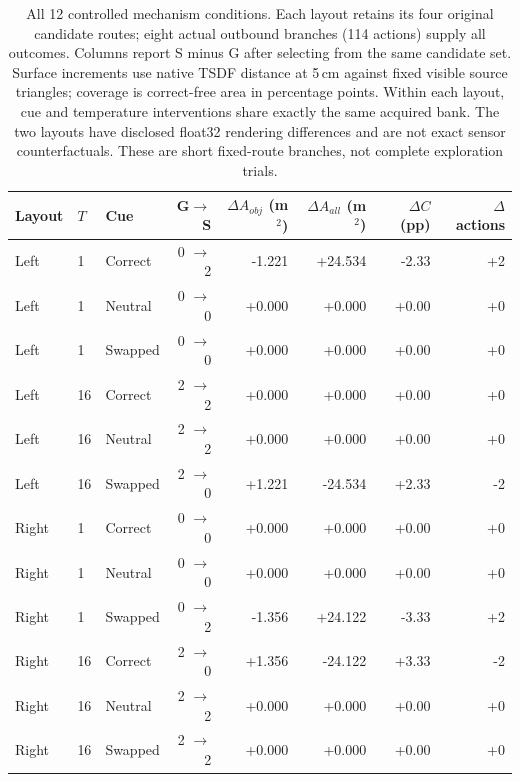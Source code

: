 \begin{table}[tbp]
\centering\small
\caption{All 12 controlled mechanism conditions. Each layout retains its four original candidate routes; eight actual outbound branches (114 actions) supply all outcomes. Columns report S minus G after selecting from the same candidate set. Surface increments use native TSDF distance at 5\,cm against fixed visible source triangles; coverage is correct-free area in percentage points. Within each layout, cue and temperature interventions share exactly the same acquired bank. The two layouts have disclosed float32 rendering differences and are not exact sensor counterfactuals. These are short fixed-route branches, not complete exploration trials.}
\label{tab:b9-mechanism}
\begin{tabular}{lllrrrrr}
\toprule
Layout & $T$ & Cue & G$\to$S & $\Delta A_{obj}$ (m$^2$) & $\Delta A_{all}$ (m$^2$) & $\Delta C$ (pp) & $\Delta$ actions \\
\midrule
Left & 1 & Correct & 0 $\to$ 2 & -1.221 & +24.534 & -2.33 & +2 \\
Left & 1 & Neutral & 0 $\to$ 0 & +0.000 & +0.000 & +0.00 & +0 \\
Left & 1 & Swapped & 0 $\to$ 0 & +0.000 & +0.000 & +0.00 & +0 \\
Left & 16 & Correct & 2 $\to$ 2 & +0.000 & +0.000 & +0.00 & +0 \\
Left & 16 & Neutral & 2 $\to$ 2 & +0.000 & +0.000 & +0.00 & +0 \\
Left & 16 & Swapped & 2 $\to$ 0 & +1.221 & -24.534 & +2.33 & -2 \\
Right & 1 & Correct & 0 $\to$ 0 & +0.000 & +0.000 & +0.00 & +0 \\
Right & 1 & Neutral & 0 $\to$ 0 & +0.000 & +0.000 & +0.00 & +0 \\
Right & 1 & Swapped & 0 $\to$ 2 & -1.356 & +24.122 & -3.33 & +2 \\
Right & 16 & Correct & 2 $\to$ 0 & +1.356 & -24.122 & +3.33 & -2 \\
Right & 16 & Neutral & 2 $\to$ 2 & +0.000 & +0.000 & +0.00 & +0 \\
Right & 16 & Swapped & 2 $\to$ 2 & +0.000 & +0.000 & +0.00 & +0 \\
\bottomrule
\end{tabular}
\end{table}
